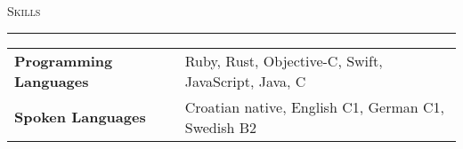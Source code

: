 \documentclass[10pt, a4paper, final, onecolumn, oneside, notitlepage]{article}
\newcommand{\sectionspacing}[0]{ \vspace{10pt} } %
\newcommand{\sectionrule}[0]{ \rule[6pt]{\textwidth}{0.5pt} } %
\renewcommand{\section}[1]{\sectionspacing {\large \scshape #1} \sectionrule}
\begin{document}
\begin{center}

\section{Skills}
\begin{tabular}{ >{\hfill}p{} p{} }
\textbf{Programming Languages} & Ruby, Rust, Objective-C, Swift, JavaScript,
Java, C \\
\textbf{Spoken Languages} & Croatian native, English C1, German C1,
Swedish B2 \\
\end{tabular}

\end{center}
\end{document}
